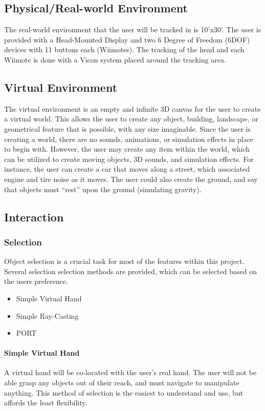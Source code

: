 \subsection{Physical/Real-world Environment}
The real-world environment that the user will be tracked in is 10'x30'.
The user is provided with a Head-Mounted Display and two 6 Degree of Freedom (6DOF) devices with 11 buttons each (Wiimotes).
The tracking of the head and each Wiimote is done with a Vicon system placed around the tracking area.

\subsection{Virtual Environment}
The virtual environment is an empty and infinite 3D canvas for the user to create a virtual world.
This allows the user to create any object, building, landscape, or geometrical feature that is possible, with any size imaginable.
Since the user is creating a world, there are no sounds, animations, or simulation effects in place to begin with.
However, the user may create any item within the world, which can be utilized to create moving objects, 3D sounds, and simulation effects.
For instance, the user can create a car that moves along a street, which associated engine and tire noise as it moves.
The user could also create the ground, and say that objects must ``rest'' upon the ground (simulating gravity).

\subsection{Interaction}

\subsubsection{Selection}
Object selection is a crucial task for most of the features within this project.
Several selection selection methods are provided, which can be selected based on the users preference.
\begin{itemize}
	\item Simple Virtual Hand
	\item Simple Ray-Casting
	\item PORT
\end{itemize}

\paragraph{Simple Virtual Hand}
A virtual hand will be co-located with the user's real hand.
The user will not be able grasp any objects out of their reach, and must navigate to manipulate anything.
This method of selection is the easiest to understand and use, but affords the least flexibility.

